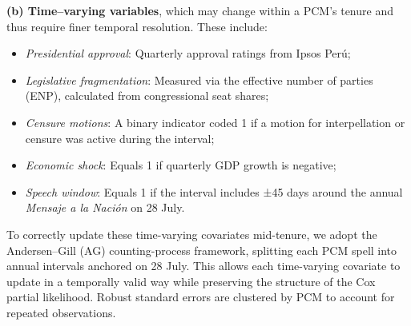 \documentclass[a4paper, 12pt]{article}
\begin{document}
\textbf{(b) Time–varying variables}, which may change within a PCM’s tenure and thus require finer temporal resolution. These include:

\begin{itemize}
    \item \textit{Presidential approval}: Quarterly approval ratings from Ipsos Perú;
    \item \textit{Legislative fragmentation}: Measured via the effective number of parties (ENP), calculated from congressional seat shares;
    \item \textit{Censure motions}: A binary indicator coded 1 if a motion for interpellation or censure was active during the interval;
    \item \textit{Economic shock}: Equals 1 if quarterly GDP growth is negative;
    \item \textit{Speech window}: Equals 1 if the interval includes ±45 days around the annual \textit{Mensaje a la Nación} on 28 July.
\end{itemize}

To correctly update these time-varying covariates mid-tenure, we adopt the Andersen–Gill (AG) counting-process framework, splitting each PCM spell into annual intervals anchored on 28 July. This allows each time-varying covariate to update in a temporally valid way while preserving the structure of the Cox partial likelihood. Robust standard errors are clustered by PCM to account for repeated observations.
\end{document}
